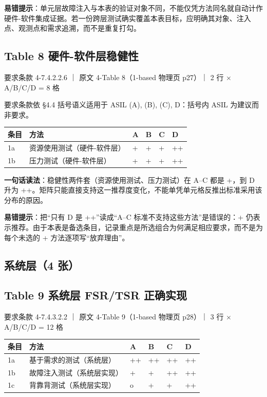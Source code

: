 \textbf{易错提示}：单元层故障注入与本表的验证对象不同，不能仅凭方法同名就自动计作硬件-软件集成证据。若一份跨层测试确实覆盖本表目标，应明确其对象、注入点、观测点和需求追溯，而不是重复打勾。

\subsection{Table 8 硬件-软件层稳健性}

要求条款 4-7.4.2.2.6 ｜ 原文 4-Table 8（1-based 物理页 p27）｜ 2 行 \(\times\) A/B/C/D = 8 格

\begin{noteblock}
要求条款依 §4.4 括号语义适用于 ASIL (A), (B), (C), D：括号内 ASIL 为建议而非要求。
\end{noteblock}

\begin{center}
\begingroup\small
\setlength{\tabcolsep}{4pt}
\begin{tabularx}{\linewidth}{@{}XXXXXX@{}}
\toprule
条目 & 方法 & A & B & C & D \\
\midrule
1a & 资源使用测试（硬件-软件层） & + & + & + & ++ \\
1b & 压力测试（硬件-软件层） & + & + & + & ++ \\
\bottomrule
\end{tabularx}
\endgroup
\end{center}

\textbf{一句话读法}：稳健性两件套（资源使用测试、压力测试）在 A–C 都是 +，到 D 升为 ++。矩阵只能直接支持这一推荐度变化，不能单凭单元格反推出标准采用该分布的原因。

\textbf{易错提示}：把“只有 D 是 ++”读成“A–C 标准不支持这些方法”是错误的：+ 仍表示推荐。由于本表是备选条目，记录重点是所选组合为何满足相应要求，而不是为每个未选的 + 方法逐项写“放弃理由”。

\subsection{系统层（4 张）}

\subsection{Table 9 系统层 FSR/TSR 正确实现}

要求条款 4-7.4.3.2.2 ｜ 原文 4-Table 9（1-based 物理页 p28）｜ 3 行 \(\times\) A/B/C/D = 12 格

\begin{center}
\begingroup\small
\setlength{\tabcolsep}{4pt}
\begin{tabularx}{\linewidth}{@{}XXXXXX@{}}
\toprule
条目 & 方法 & A & B & C & D \\
\midrule
1a & 基于需求的测试（系统层） & ++ & ++ & ++ & ++ \\
1b & 故障注入测试（系统层实现） & + & + & ++ & ++ \\
1c & 背靠背测试（系统层实现） & o & + & + & ++ \\
\bottomrule
\end{tabularx}
\endgroup
\end{center}

